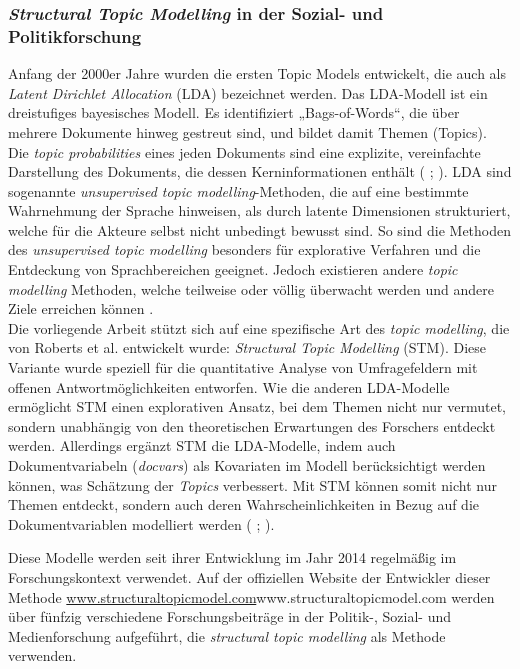 \subsubsection{\textit{Structural Topic Modelling} in der Sozial- und Politikforschung}

Anfang der 2000er Jahre wurden die ersten Topic Models entwickelt, die auch als \textit{Latent Dirichlet Allocation} (LDA) bezeichnet werden.
Das LDA-Modell ist ein dreistufiges bayesisches Modell. 
Es identifiziert „Bags-of-Words“, die über mehrere Dokumente hinweg gestreut sind, und bildet damit Themen (\glqq Topics\grqq{}). 
Die \textit{topic probabilities} eines jeden Dokuments sind eine explizite, vereinfachte Darstellung des Dokuments, die dessen Kerninformationen enthält (\cite[993]{Blei2003LatentDirichletAllocation} ; \cite[1171]{Heiberger2021FacetsSpecialization}).
LDA sind sogenannte \textit{unsupervised topic modelling}-Methoden, die auf eine bestimmte Wahrnehmung der Sprache hinweisen, als durch latente Dimensionen strukturiert, welche für die Akteure selbst nicht unbedingt bewusst sind.
So sind die Methoden des \textit{unsupervised topic modelling} besonders für explorative Verfahren und die Entdeckung von Sprachbereichen geeignet.
Jedoch existieren andere \textit{topic modelling} Methoden, welche teilweise oder völlig überwacht werden und andere Ziele erreichen können \parencite[611]{McFarland2013DifferentiatingLanguageUsage}.\\

Die vorliegende Arbeit stützt sich auf eine spezifische Art des \textit{topic modelling}, die von Roberts et al. \parencite*{Roberts2014StructuralTopicModels} entwickelt wurde: \textit{Structural Topic Modelling} (STM).
Diese Variante wurde speziell für die quantitative Analyse von Umfragefeldern mit offenen Antwortmöglichkeiten entworfen. 
Wie die anderen LDA-Modelle ermöglicht STM einen explorativen Ansatz, bei dem Themen nicht nur vermutet, sondern unabhängig von den theoretischen Erwartungen des Forschers entdeckt werden.
Allerdings ergänzt STM die LDA-Modelle, indem auch Dokumentvariabeln (\textit{docvars}) als Kovariaten im Modell berücksichtigt werden können, was Schätzung der \textit{Topics} verbessert.
Mit STM können somit nicht nur Themen entdeckt, sondern auch deren Wahrscheinlichkeiten in Bezug auf die Dokumentvariablen modelliert werden (\cite[1066]{Roberts2014StructuralTopicModels} ; \cite[1171]{Heiberger2021FacetsSpecialization}). 

Diese Modelle werden seit ihrer Entwicklung im Jahr 2014 regelmäßig im Forschungskontext verwendet. 
Auf der offiziellen Website der Entwickler dieser Methode \url{www.structuraltopicmodel.com}{www.structuraltopicmodel.com} werden über fünfzig verschiedene Forschungsbeiträge in der Politik-, Sozial- und Medienforschung aufgeführt, die \textit{structural topic modelling} als Methode verwenden.


